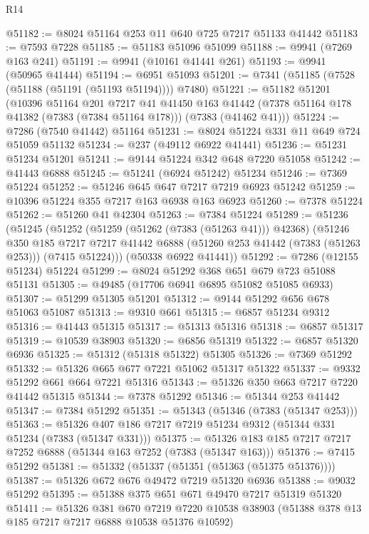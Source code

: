 \begin{lexlean}{R14}
\begin{coremodule}
@51182 := @8024 @51164 @253 @11 @640 @725 @7217 @51133 @41442
@51183 := @7593 @7228
@51185 := @51183 @51096 @51099
@51188 := @9941 (@7269 @163 @241)
@51191 := @9941 (@10161 @41441 @261)
@51193 := @9941 (@50965 @41444)
@51194 := @6951 @51093
@51201 := @7341 (@51185 (@7528 (@51188 (@51191 (@51193 @51194)))) @7480)
@51221 := @51182
    @51201
    (@10396
      @51164
      @201
      @7217
      @41
      @41450
      @163
      @41442
      (@7378 @51164 @178 @41382 (@7383 (@7384 @51164 @178)))
      (@7383 (@41462 @41)))
@51224 := @7286 (@7540 @41442) @51164
@51231 := @8024 @51224 @331 @11 @649 @724 @51059 @51132
@51234 := @237 (@49112 @6922 @41441)
@51236 := @51231 @51234 @51201
@51241 := @9144 @51224 @342 @648 @7220 @51058
@51242 := @41443 @6888
@51245 := @51241 (@6924 @51242) @51234
@51246 := @7369 @51224
@51252 := @51246 @645 @647 @7217 @7219 @6923 @51242
@51259 := @10396 @51224 @355 @7217 @163 @6938 @163 @6923
@51260 := @7378 @51224
@51262 := @51260 @41 @42304
@51263 := @7384 @51224
@51289 := @51236
    (@51245
      (@51252
        (@51259 (@51262 (@7383 (@51263 @41))) @42368)
        (@51246
          @350
          @185
          @7217
          @7217
          @41442
          @6888
          (@51260 @253 @41442 (@7383 (@51263 @253)))
          (@7415 @51224)))
      (@50338 @6922 @41441))
@51292 := @7286 (@12155 @51234) @51224
@51299 := @8024 @51292 @368 @651 @679 @723 @51088 @51131
@51305 := @49485 (@17706 @6941 @6895 @51082 @51085 @6933)
@51307 := @51299 @51305 @51201
@51312 := @9144 @51292 @656 @678 @51063 @51087
@51313 := @9310 @661
@51315 := @6857 @51234 @9312
@51316 := @41443 @51315
@51317 := @51313 @51316
@51318 := @6857 @51317
@51319 := @10539 @38903
@51320 := @6856 @51319
@51322 := @6857 @51320 @6936
@51325 := @51312 (@51318 @51322) @51305
@51326 := @7369 @51292
@51332 := @51326 @665 @677 @7221 @51062 @51317 @51322
@51337 := @9332 @51292 @661 @664 @7221 @51316
@51343 := @51326 @350 @663 @7217 @7220 @41442 @51315
@51344 := @7378 @51292
@51346 := @51344 @253 @41442
@51347 := @7384 @51292
@51351 := @51343 (@51346 (@7383 (@51347 @253)))
@51363 := @51326 @407 @186 @7217 @7219 @51234 @9312 (@51344 @331 @51234 (@7383 (@51347 @331)))
@51375 := @51326 @183 @185 @7217 @7217 @7252 @6888 (@51344 @163 @7252 (@7383 (@51347 @163)))
@51376 := @7415 @51292
@51381 := @51332 (@51337 (@51351 (@51363 (@51375 @51376))))
@51387 := @51326 @672 @676 @49472 @7219 @51320 @6936
@51388 := @9032 @51292
@51395 := @51388 @375 @651 @671 @49470 @7217 @51319 @51320
@51411 := @51326
    @381
    @670
    @7219
    @7220
    @10538
    @38903
    (@51388 @378 @13 @185 @7217 @7217 @6888 @10538 @51376 @10592)

\end{coremodule}
\end{lexlean}
